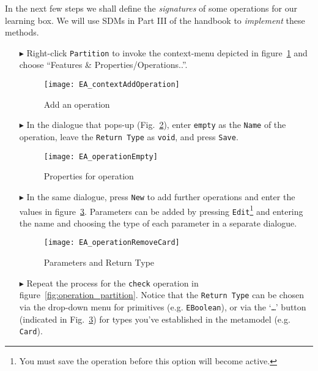 In the next few steps we shall define the \emph{signatures} of some operations for our learning box. We will use SDMs in Part III of the handbook to
\emph{implement} these methods.

\begin{enumerate}
\item[$\blacktriangleright$] Right-click \texttt{Partition} to invoke the context-menu depicted in figure~\ref{fig:add_operation} and choose ``Features \&
Properties/Operations..''.

\begin{figure}[htbp]
	\centering
  \texttt{[image: EA\_contextAddOperation]}
	\caption{Add an operation}
	\label{fig:add_operation}
\end{figure}
\FloatBarrier

\item[$\blacktriangleright$] In the dialogue that pops-up (Fig.~\ref{fig:operation_properties}), enter \texttt{empty} as the \texttt{Name} of the operation,
leave the \texttt{Return Type} as \texttt{void}, and press \texttt{Save}.

\begin{figure}[htbp]
	\centering
  	\texttt{[image: EA\_operationEmpty]}
	\caption{Properties for operation}
	\label{fig:operation_properties}
\end{figure}
\FloatBarrier

\item[$\blacktriangleright$] In the same dialogue, press \texttt{New} to add further operations and enter the values in figure~\ref{fig:operation_parameters}. 
Parameters can be added by pressing \texttt{Edit}\footnote{You must save the operation before this option will become active.} and entering the name and
choosing the type of each parameter in a separate dialogue.

\begin{figure}[htbp]
	\centering
  \texttt{[image: EA\_operationRemoveCard]}
	\caption{Parameters and Return Type}
	\label{fig:operation_parameters}
\end{figure}
\FloatBarrier

\vfill
\pagebreak

\item[$\blacktriangleright$] Repeat the process for the \texttt{check} operation in figure~\ref{fig:operation_partition}.
Notice that the \texttt{Return Type} can be chosen via the drop-down menu for primitives (e.g. \texttt{EBoolean}), or via the `\texttt{\ldots}' button
(indicated in Fig.~\ref{fig:operation_parameters}) for types you've established in the metamodel (e.g. \texttt{Card}).
\end{enumerate}

